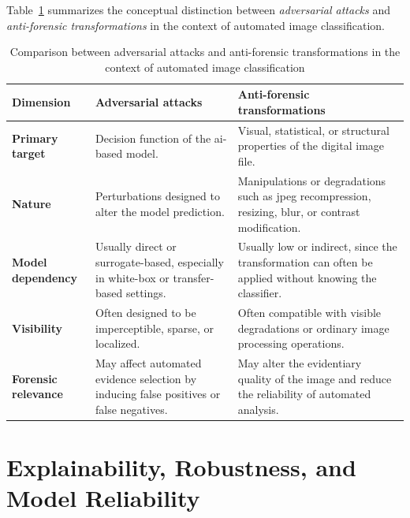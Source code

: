 Table~\ref{tab:adv_vs_antiforensics} summarizes the conceptual distinction
between \textit{adversarial attacks} and \textit{anti-forensic transformations}
in the context of automated image classification.

\begin{table}[htbp]
    \centering
    \small
    \renewcommand{\arraystretch}{1.25}
    \begin{tabular}{@{}p{}p{}p{}@{}}
        \toprule
        \textbf{Dimension} & \textbf{Adversarial attacks} & \textbf{Anti-forensic transformations} \\
        \midrule
        \textbf{Primary target} &
        Decision function of the \gls{ai}-based model. &
        Visual, statistical, or structural properties of the digital image file. \\
        \textbf{Nature} &
        Perturbations designed to alter the model prediction. &
        Manipulations or degradations such as \gls{jpeg} recompression, resizing, blur, or contrast modification. \\
        \textbf{Model dependency} &
        Usually direct or surrogate-based, especially in white-box or transfer-based settings. &
        Usually low or indirect, since the transformation can often be applied without knowing the classifier. \\
        \textbf{Visibility} &
        Often designed to be imperceptible, sparse, or localized. &
        Often compatible with visible degradations or ordinary image processing operations. \\
        \textbf{Forensic relevance} &
        May affect automated evidence selection by inducing false positives or false negatives. &
        May alter the evidentiary quality of the image and reduce the reliability of automated analysis. \\
        \bottomrule
    \end{tabular}
    \caption{Comparison between adversarial attacks and anti-forensic transformations in the context of automated image classification}
    \label{tab:adv_vs_antiforensics}
\end{table}

\section{Explainability, Robustness, and Model Reliability}
\label{sec:background_xai_robustness}

